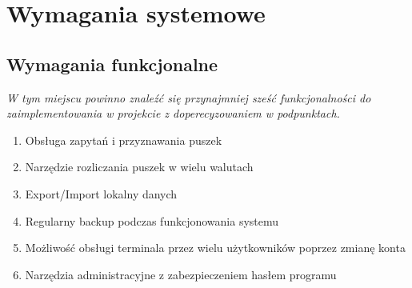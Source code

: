 \documentclass{article}
\begin{document}

\section{Wymagania systemowe}
\subsection{Wymagania funkcjonalne}
{\small\it W tym miejscu powinno znaleźć się przynajmniej sześć funkcjonalności do zaimplementowania w projekcie z doperecyzowaniem w podpunktach.}
\begin{enumerate}
  \item Obsługa zapytań i przyznawania puszek
  \item Narzędzie rozliczania puszek w wielu walutach
  \item Export/Import lokalny danych
  \item Regularny backup podczas funkcjonowania systemu
  \item Możliwość obsługi terminala przez wielu użytkowników poprzez zmianę konta
  \item Narzędzia administracyjne z zabezpieczeniem hasłem programu
\end{enumerate}
\end{document}
